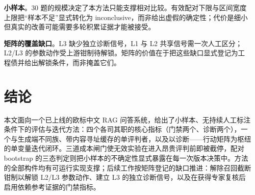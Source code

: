 \documentclass[11pt,a4paper,fontset=fandol]{ctexart}
\begin{document}
\textbf{小样本}。30 题的规模决定了本方法只能支撑相对比较。有效配对下限与区间宽度上限把``样本不足''显式转化为 inconclusive，而非给出虚假的确定性；代价是细小但真实的改善可能需要多轮积累证据才能被接受。

\textbf{矩阵的覆盖缺口}。L3 缺少独立诊断信号，L1 与 L2 共享信号需一次人工区分；L2/L3 的参数动作受上游钳制待解锁。矩阵的价值在于把这些缺口显式登记为工程债并给出解锁条件，而非掩盖它们。

\section{结论}
\label{sec:conclusion}

本文面向一个已上线的欧标中文 RAG 问答系统，给出了小样本、无持续人工标注条件下的评估与迭代方法：四个各司其职的核心指标（门禁两个、诊断两个），一个与生成端不同族、带内容寻址缓存的单评判者，以及以诊断——行动矩阵为枢纽的单变量迭代闭环。三道成本闸门使无效实验在进入昂贵评判前即被截停，配对 bootstrap 的三态判定则把小样本的不确定性显式暴露在每一次版本决策中。方法的全部构件均有可运行实现支撑；后续工作按矩阵登记的缺口推进：解除召回截断钳制以解锁 L2/L3 参数动作、建立 L3 的独立诊断信号，以及在获得专家复核后启用依赖参考证据的门禁指标。
\end{document}
